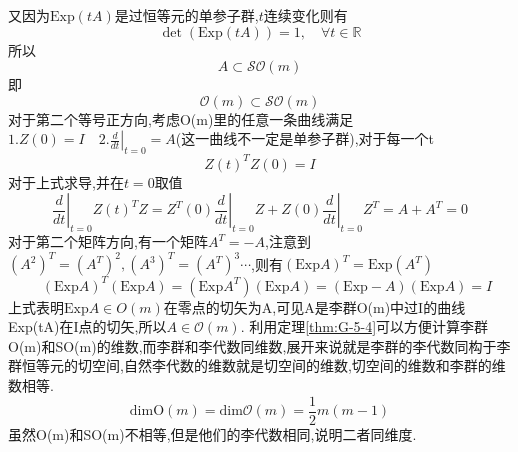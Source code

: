 \documentclass[../main.tex]{subfiles}
\begin{document}
又因为$\text{Exp}(tA)$是过恒等元的单参子群,$t$连续变化则有
$$\det(\text{Exp}(tA)) = 1,\quad \forall t\in \mathbb{R}$$
所以 $$A \subset \mathscr{SO}(m)$$
即$$\mathscr{O}(m)\subset\mathscr{SO}(m)$$
对于第二个等号正方向,考虑O(m)里的任意一条曲线满足$1.Z(0) = I \quad 2. \left.\frac{d}{dt}\right|_{t = 0}=A$(这一曲线不一定是单参子群),对于每一个t
$$Z(t)^TZ(0)= I$$
对于上式求导,并在$t = 0$取值
$$\left.\frac{d}{dt}\right|_{t=0}Z(t)^TZ =Z^T(0) \left.\frac{d}{dt}\right|_{t=0}Z+ Z(0) \left.\frac{d}{dt}\right|_{t=0}Z^T = A + A^T = 0$$
对于第二个矩阵方向,有一个矩阵$A^T = -A$,注意到$(A^2)^T = (A^T)^2,(A^3)^T = (A^T)^3\cdots $,则有$(\text{Exp}A)^T=\text{Exp}(A^T)$
$$\quad (\text{Exp}A)^T (\text{Exp}A)=(\text{Exp}A^T)(\text{Exp}A) = (\text{Exp}-A)(\text{Exp}A)=I$$
上式表明$\text{Exp}A\in O(m)$在零点的切矢为A,可见A是李群O(m)中过I的曲线Exp(tA)在I点的切矢,所以$A\in\mathscr{O}(m)$.
利用定理\ref{thm:G-5-4}可以方便计算李群O(m)和SO(m)的维数,而李群和李代数同维数,展开来说就是李群的李代数同构于李群恒等元的切空间,自然李代数的维数就是切空间的维数,切空间的维数和李群的维数相等.
$$\text{dimO}(m) = \text{dim}\mathscr{O}(m) = \frac{1}{2}m(m-1)$$
虽然O(m)和SO(m)不相等,但是他们的李代数相同,说明二者同维度.
\end{document}
